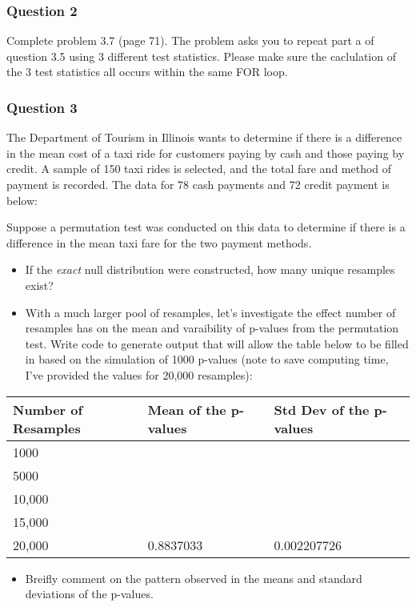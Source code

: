 \documentclass[]{article}
\providecommand{\tightlist}{%
  \setlength{\itemsep}{0pt}\setlength{\parskip}{0pt}}
\begin{document}
\subsubsection{Question 2}\label{question-2}

Complete problem 3.7 (page 71). The problem asks you to repeat part a of
question 3.5 using 3 different test statistics. Please make sure the
caclulation of the 3 test statistics all occurs within the same FOR
loop.

\subsubsection{Question 3}\label{question-3}

The Department of Tourism in Illinois wants to determine if there is a
difference in the mean cost of a taxi ride for customers paying by cash
and those paying by credit. A sample of 150 taxi rides is selected, and
the total fare and method of payment is recorded. The data for 78 cash
payments and 72 credit payment is below:

Suppose a permutation test was conducted on this data to determine if
there is a difference in the mean taxi fare for the two payment methods.

\begin{itemize}
\item
  If the \emph{exact} null distribution were constructed, how many
  unique resamples exist?
\item
  With a much larger pool of resamples, let's investigate the effect
  number of resamples has on the mean and varaibility of p-values from
  the permutation test. Write code to generate output that will allow
  the table below to be filled in based on the simulation of 1000
  p-values (note to save computing time, I've provided the values for
  20,000 resamples):
\end{itemize}

\begin{longtable}[]{@{}lll@{}}
\toprule
Number of Resamples & Mean of the p-values & Std Dev of the
p-values\tabularnewline
\midrule
\endhead
1000 & &\tabularnewline
5000 & &\tabularnewline
10,000 & &\tabularnewline
15,000 & &\tabularnewline
20,000 & 0.8837033 & 0.002207726\tabularnewline
\bottomrule
\end{longtable}

\begin{itemize}
\tightlist
\item
  Breifly comment on the pattern observed in the means and standard
  deviations of the p-values.
\end{itemize}
\end{document}
